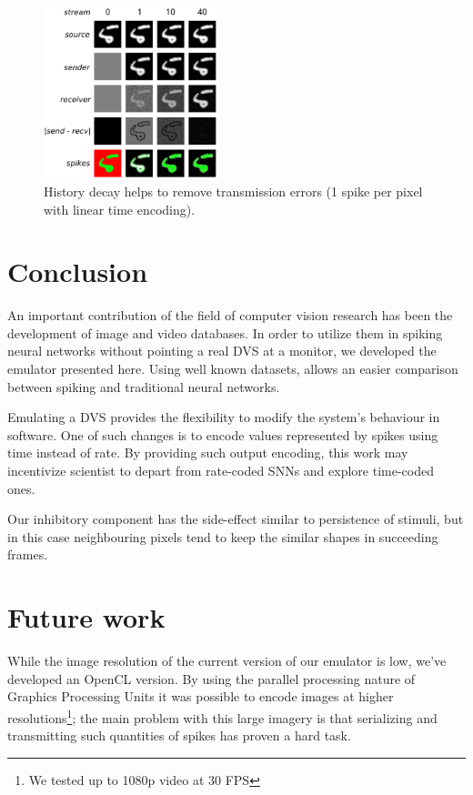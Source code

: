\documentclass[twocolumn, a4paper]{article}
\begin{document}
\begin{figure}[htb]
  \centering
  
  \includegraphics[width=0.45\textwidth]{history_decay}
  \caption{History decay helps to remove transmission errors (1 spike per pixel with linear time encoding).}
  \label{fig:history_decay}
\end{figure}


\section{Conclusion}
\label{sec:conclusions}
An important contribution of the field of computer vision research has been the development of image and video databases. In order to utilize them in spiking neural networks without pointing a real DVS at a monitor, we developed the emulator presented here. Using well known datasets, allows an easier comparison between spiking and traditional neural networks.

Emulating a DVS provides the flexibility to modify the system's behaviour in software. One of such changes is to encode values represented by spikes using time instead of rate. By providing such output encoding, this work may incentivize  scientist to depart from rate-coded SNNs and explore time-coded ones.

Our inhibitory component has the side-effect similar to persistence of stimuli, but in this case neighbouring pixels tend to keep the similar shapes in succeeding frames. 

\section{Future work}
\label{sec:future-work}
While the image resolution of the current version of our emulator is low, we've developed an OpenCL version. By using the parallel processing nature of Graphics Processing Units it was possible to encode images at higher resolutions\footnote{We tested up to 1080p video at 30 FPS}; the main problem with this large imagery is that serializing and transmitting such quantities of spikes has proven a hard task.
\end{document}
